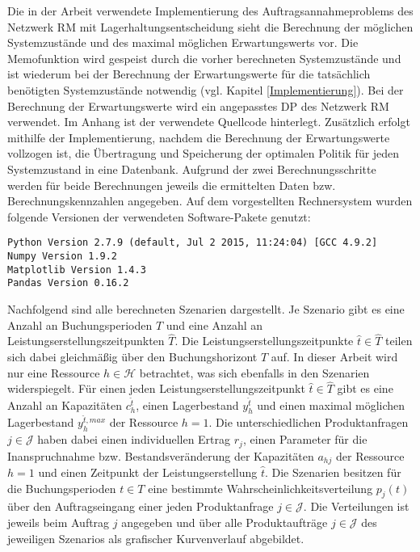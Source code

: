 Die in der Arbeit verwendete Implementierung des Auftragsannahmeproblems des Netzwerk RM mit Lagerhaltungsentscheidung sieht die Berechnung der möglichen Systemzustände und des maximal möglichen Erwartungswerts vor. Die Memofunktion wird gespeist durch die vorher berechneten Systemzustände und ist wiederum bei der Berechnung der Erwartungswerte für die tatsächlich benötigten Systemzustände notwendig (vgl. Kapitel \ref{Implementierung}). Bei der Berechnung der Erwartungswerte wird ein angepasstes DP des Netzwerk RM verwendet. Im Anhang ist der verwendete Quellcode hinterlegt. Zusätzlich erfolgt mithilfe der Implementierung, nachdem die Berechnung der Erwartungswerte vollzogen ist, die Übertragung und Speicherung der optimalen Politik für jeden Systemzustand in eine Datenbank. Aufgrund der zwei Berechnungsschritte werden für beide Berechnungen jeweils die ermittelten Daten bzw. Berechnungskennzahlen angegeben. Auf dem vorgestellten Rechnersystem wurden folgende Versionen der verwendeten Software-Pakete genutzt:

\colorbox{hellgrau}{\parbox{14cm}{\texttt{Python Version 2.7.9 (default, Jul  2 2015, 11:24:04) [GCC 4.9.2]\\
Numpy Version 1.9.2\\
Matplotlib Version 1.4.3\\
Pandas Version 0.16.2
}}}

Nachfolgend sind alle berechneten Szenarien dargestellt. Je Szenario gibt es eine Anzahl an Buchungsperioden $T$ und eine Anzahl an Leistungserstellungszeitpunkten $\hat T$. Die Leistungserstellungszeitpunkte $\hat t \in \hat T$ teilen sich dabei gleichmäßig über den Buchungshorizont $T$ auf. In dieser Arbeit wird nur eine Ressource $h\in\mathcal{H}$ betrachtet, was sich ebenfalls in den Szenarien widerspiegelt. Für einen jeden Leistungserstellungszeitpunkt $\hat t \in \hat T$ gibt es eine Anzahl an Kapazitäten $c_h^{\hat t}$, einen Lagerbestand $y_h^{\hat t}$ und einen maximal möglichen Lagerbestand $y_h^{{\hat t},max}$ der Ressource $h=1$. Die unterschiedlichen Produktanfragen $j\in\mathcal{J}$ haben dabei einen individuellen Ertrag $r_j$, einen Parameter für die Inanspruchnahme bzw. Bestandsveränderung der Kapazitäten $a_{hj}$ der Ressource $h=1$ und einen Zeitpunkt der Leistungserstellung $\hat t$. Die Szenarien besitzen für die Buchungsperioden $t\in T$ eine bestimmte Wahrscheinlichkeitsverteilung $p_j(t)$ über den Auftragseingang einer jeden Produktanfrage $j\in\mathcal{J}$. Die Verteilungen ist jeweils beim Auftrag $j$ angegeben und über alle Produktaufträge $j\in\mathcal{J}$ des jeweiligen Szenarios als grafischer Kurvenverlauf abgebildet.

